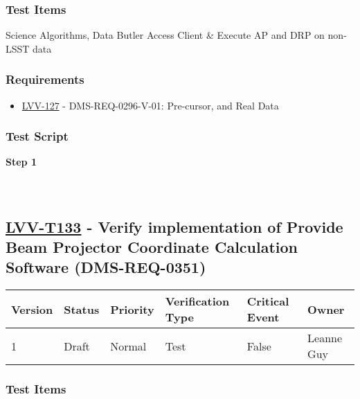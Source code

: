 \hypertarget{test-items-108}{%
\subsubsection{Test Items}\label{test-items-108}}

Science Algorithms, Data Butler Access Client \& Execute AP and DRP on
non-LSST data

\hypertarget{requirements-109}{%
\subsubsection{Requirements}\label{requirements-109}}

\begin{itemize}
\tightlist
\item
  \href{https://jira.lsstcorp.org/browse/LVV-127}{LVV-127} -
  DMS-REQ-0296-V-01: Pre-cursor, and Real Data
\end{itemize}

\hypertarget{test-script-109}{%
\subsubsection{Test Script}\label{test-script-109}}

\textbf{Step 1}\\
~\\
~\\

\hypertarget{lvv-t133---verify-implementation-of-provide-beam-projector-coordinate-calculation-software-dms-req-0351}{%
\subsection{\texorpdfstring{\href{https://jira.lsstcorp.org/secure/Tests.jspa\#/testCase/LVV-T133}{LVV-T133}
- Verify implementation of Provide Beam Projector Coordinate Calculation
Software
(DMS-REQ-0351)}{LVV-T133 - Verify implementation of Provide Beam Projector Coordinate Calculation Software (DMS-REQ-0351)}}\label{lvv-t133---verify-implementation-of-provide-beam-projector-coordinate-calculation-software-dms-req-0351}}

\begin{longtable}[]{@{}llllll@{}}
\toprule
Version & Status & Priority & Verification Type & Critical Event &
Owner\tabularnewline
\midrule
\endhead
1 & Draft & Normal & Test & False & Leanne Guy\tabularnewline
\bottomrule
\end{longtable}

\hypertarget{test-items-109}{%
\subsubsection{Test Items}\label{test-items-109}}

